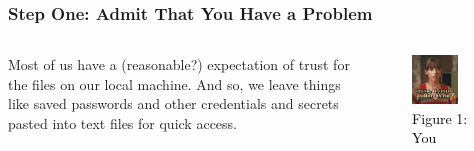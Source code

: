 \documentclass[aspectratio=169]{beamer}
\begin{document}
{
	\begin{frame}
	\frametitle{Step One: Admit That You Have a Problem}
	\begin{columns}
		Most of us have a (reasonable?) expectation of trust for the files on our local machine. And so, we leave things like saved passwords and other credentials and secrets pasted into text files for quick access.
		\begin{figure}
            \centering
            \includegraphics[width=0.77\textwidth]{../static/images/problem.jpg}
            \caption{\textcolor{black}{Figure 1: You}}
        \end{figure}

    \end{columns}


\end{frame}
}
\end{document}
